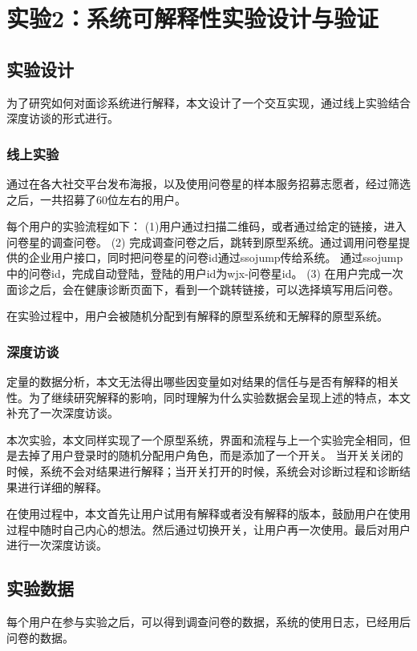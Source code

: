 \section{实验2：系统可解释性实验设计与验证}


\subsection{实验设计}

为了研究如何对面诊系统进行解释，本文设计了一个交互实现，通过线上实验结合深度访谈的形式进行。

\subsubsection{线上实验}
通过在各大社交平台发布海报，以及使用问卷星的样本服务招募志愿者，经过筛选之后，一共招募了60位左右的用户。

每个用户的实验流程如下：
(1)用户通过扫描二维码，或者通过给定的链接，进入问卷星的调查问卷。
(2) 完成调查问卷之后，跳转到原型系统。通过调用问卷星提供的企业用户接口，同时把问卷星的问卷id通过ssojump传给系统。
通过ssojump中的问卷id，完成自动登陆，登陆的用户id为wjx-{问卷星id}。
(3) 在用户完成一次面诊之后，会在健康诊断页面下，看到一个跳转链接，可以选择填写用后问卷。

在实验过程中，用户会被随机分配到有解释的原型系统和无解释的原型系统。

\subsubsection{深度访谈}

定量的数据分析，本文无法得出哪些因变量如对结果的信任与是否有解释的相关性。为了继续研究解释的影响，同时理解为什么实验数据会呈现上述的特点，本文补充了一次深度访谈。

本次实验，本文同样实现了一个原型系统，界面和流程与上一个实验完全相同，但是去掉了用户登录时的随机分配用户角色，而是添加了一个开关。
当开关关闭的时候，系统不会对结果进行解释；当开关打开的时候，系统会对诊断过程和诊断结果进行详细的解释。

在使用过程中，本文首先让用户试用有解释或者没有解释的版本，鼓励用户在使用过程中随时自己内心的想法。然后通过切换开关，让用户再一次使用。最后对用户进行一次深度访谈。

\subsection{实验数据}
每个用户在参与实验之后，可以得到调查问卷的数据，系统的使用日志，已经用后问卷的数据。

